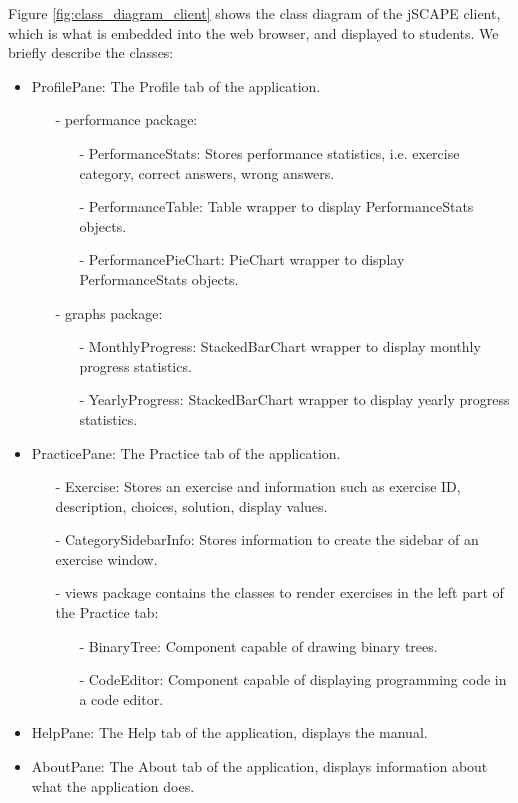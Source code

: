 Figure \ref{fig:class_diagram_client} shows the class diagram of the jSCAPE client, which is what is embedded into the web browser, and displayed to students. We briefly describe the classes:
\begin{itemize}
\item \textsf{ProfilePane}: The Profile tab of the application.
      \begin{itemize}
      \item[-] \textsf{performance} package:
               \begin{itemize}
               \item[-] \textsf{PerformanceStats}: Stores performance statistics, i.e. exercise category, correct answers, wrong answers.
               \item[-] \textsf{PerformanceTable}: Table wrapper to display \textsf{PerformanceStats} objects.
               \item[-] \textsf{PerformancePieChart}: PieChart wrapper to display \textsf{PerformanceStats} objects.
               \end{itemize}
      \item[-] \textsf{graphs} package:
               \begin{itemize}
               \item[-] \textsf{MonthlyProgress}: StackedBarChart wrapper to display monthly progress statistics.
               \item[-] \textsf{YearlyProgress}: StackedBarChart wrapper to display yearly progress statistics.
               \end{itemize}
      \end{itemize}
\item \textsf{PracticePane}: The Practice tab of the application.
       \begin{itemize}
       \item[-] \textsf{Exercise}: Stores an exercise and information such as exercise ID, description, choices, solution, display values.
       \item[-] \textsf{CategorySidebarInfo}: Stores information to create the sidebar of an exercise window.
       \item[-] \textsf{views} package contains the classes to render exercises in the left part of the Practice tab:
                \begin{itemize}
                \item[-] \textsf{BinaryTree}: Component capable of drawing binary trees.
                \item[-] \textsf{CodeEditor}: Component capable of displaying programming code in a code editor.
                \end{itemize}
       \end{itemize}

\item \textsf{HelpPane}: The Help tab of the application, displays the manual.

\item \textsf{AboutPane}: The About tab of the application, displays information about what the application does.
\end{itemize}

